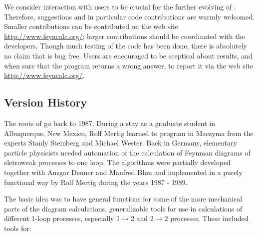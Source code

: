 
We consider interaction with users to be crucial
for the further evolving of \fc. Therefore, suggestions and in particular
code contributions are warmly welcomed. Smaller contributions can be contributed
on the web site \href{http://www.feyncalc.org/}{http://www.feyncalc.org/}; 
larger contributions should be coordinated with the developers.
Though much testing of the code has been done, there is absolutely no claim that
\fc is bug free. Users are encouraged to be sceptical about results, and when sure that the
program  returns a wrong answer, to report it via the web site
\href{http://www.feyncalc.org/}{http://www.feyncalc.org/}.

\subsection*{Version History}

The roots of \fc go back to 1987. 
During a stay as a graduate student in Albuquerque, New Mexico, Rolf Mertig learned to program in Macsyma \cite{Drinkard:1981dr} from the experts Stanly Steinberg and Michael Wester. Back in Germany, 
elementary particle physicists needed automation of the calculation of Feynman diagrams of eletroweak 
processes to one loop. The algorithms were partially developed together with 
Ansgar Denner and Manfred B\ODoubleDot{}hm and implemented in a 
purely functional way by Rolf Mertig during the years 1987 - 1989. 

The basic idea was to have general functions for some of the more mechanical parts of the diagram calculations, generalizable tools for use in calculations of different 1-loop processes, especially 1\(\rightarrow \)2 and 2\(\rightarrow \)2 processes. These included tools for:

